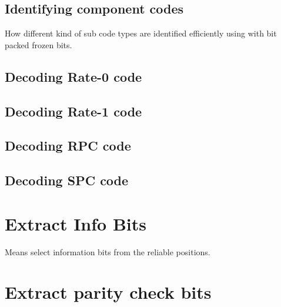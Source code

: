 \subsection{Identifying component codes}
How different kind of sub code types are identified efficiently using with bit packed frozen bits.

\subsection{Decoding Rate-0 code}

\subsection{Decoding Rate-1 code}

\subsection{Decoding RPC code}

\subsection{Decoding SPC code}

\section{Extract Info Bits}
Means select information bits from the reliable positions.

\section{Extract parity check bits}


